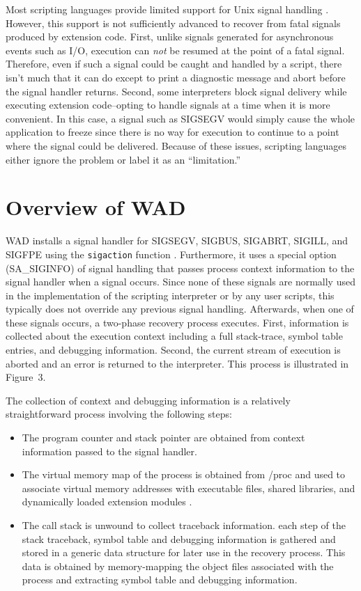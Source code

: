 Most scripting languages provide limited support for Unix signal
handling \cite{stevens}.  However, this support is not sufficiently advanced to
recover from fatal signals produced by extension code.
First, unlike signals generated for asynchronous events such as I/O,
execution can {\em not} be resumed at the point of a fatal signal.
Therefore, even if such a signal could be caught and handled by a script,
there isn't much that it can do except to print a diagnostic
message and abort before the signal handler returns.  Second, 
some interpreters block signal delivery while executing
extension code--opting to handle signals at a time when it is more convenient.
In this case, a signal such as SIGSEGV would simply cause the whole application
to freeze since there is no way for execution to continue to a point where
the signal could be delivered.  Because of these issues, scripting languages
either ignore the problem or label it as an ``limitation.''

\section{Overview of WAD}

WAD installs a signal handler for SIGSEGV, SIGBUS, SIGABRT, SIGILL,
and SIGFPE using the {\tt sigaction} function
\cite{stevens}. Furthermore, it uses a special option (SA\_SIGINFO) of
signal handling that passes process context information to the signal
handler when a signal occurs. Since none of these signals are normally used in the
implementation of the scripting interpreter or by any user scripts,
this typically does not override any previous signal handling.
Afterwards, when one of these signals occurs, a two-phase recovery
process executes. First, information is collected about the execution
context including a full stack-trace, symbol table entries, and
debugging information.  Second, the current stream of execution is
aborted and an error is returned to the interpreter.  This process is
illustrated in Figure~3.

The collection of context and debugging information is a relatively
straightforward process involving the following steps:

\begin{itemize}
\item The program counter and stack pointer are obtained from 
context information passed to the signal handler.

\item The virtual memory map of the process is obtained from /proc
and used to associate virtual memory addresses with executable files,
shared libraries, and dynamically loaded extension modules \cite{proc}.

\item The call stack is unwound to collect traceback information.
each step of the stack traceback, symbol table and debugging
information is gathered and stored in a generic data structure for later use
in the recovery process.  This data is obtained by memory-mapping
the object files associated with the process and extracting
symbol table and debugging information. 
\end{itemize}

